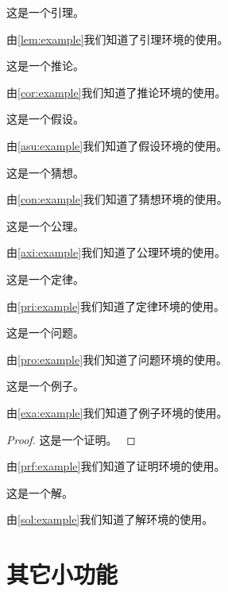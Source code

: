 \documentclass[withoutpreface,bwprint]{cumcmthesis}
\begin{document}
\begin{lemma}
    这是一个引理。
    \label{lem:example}
\end{lemma}
由\cref{lem:example}我们知道了引理环境的使用。

\begin{corollary}
    这是一个推论。
    \label{cor:example}
\end{corollary}
由\cref{cor:example}我们知道了推论环境的使用。

\begin{assumption}
    这是一个假设。
    \label{asu:example}
\end{assumption}
由\cref{asu:example}我们知道了假设环境的使用。

\begin{conjecture}
    这是一个猜想。
    \label{con:example}
\end{conjecture}
由\cref{con:example}我们知道了猜想环境的使用。

\begin{axiom}
    这是一个公理。
    \label{axi:example}
\end{axiom}
由\cref{axi:example}我们知道了公理环境的使用。

\begin{principle}
    这是一个定律。
    \label{pri:example}
\end{principle}
由\cref{pri:example}我们知道了定律环境的使用。

\begin{problem}
    这是一个问题。
    \label{pro:example}
\end{problem}
由\cref{pro:example}我们知道了问题环境的使用。

\begin{example}
    这是一个例子。
    \label{exa:example}
\end{example}
由\cref{exa:example}我们知道了例子环境的使用。

\begin{proof}
    这是一个证明。
    \label{prf:example}
\end{proof}
由\cref{prf:example}我们知道了证明环境的使用。

\begin{solution}
    这是一个解。
    \label{sol:example}
\end{solution}
由\cref{sol:example}我们知道了解环境的使用。



\section{其它小功能}
\end{document}
